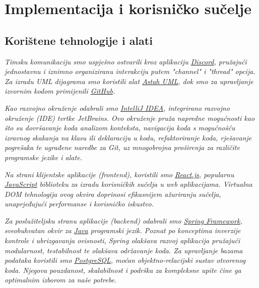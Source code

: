 
\chapter{Implementacija i korisničko sučelje}

		\usepackage{hyperref}
		
		\section{Korištene tehnologije i alati}

        \textit{ Timsku komunikaciju smo uspješno ostvarili kroz aplikaciju \href{https://discord.com/}{Discord}, pružajući jednostavnu i iznimno organiziranu interakciju putem "channel" i "thread" opcija. Za izradu UML dijagrama smo koristili alat \href{https://astah.net/products/astah-uml/}{Astah UML}, dok smo za upravljanje izvornim kodom primijenili \href{https://github.com/}{GitHub}.}

        \textit{Kao razvojno okruženje odabrali smo \href{https://www.jetbrains.com/idea/}{IntelliJ IDEA}, integrirano razvojno okruženje (IDE) tvrtke JetBrains. Ovo okruženje pruža napredne mogućnosti kao što su dovršavanje koda analizom konteksta, navigacija koda s mogućnošću izravnog skakanja na klasu ili deklaraciju u kodu, refaktoriranje koda, rješavanje pogrešaka te ugrađene naredbe za Git, uz mnogobrojna proširenja za različite programske jezike i alate.}

        \textit{Na strani klijentske aplikacije (frontend), koristili smo \href{https://reactjs.org/}{React.js}, popularnu \href{https://www.javascript.com/}{JavaScript} biblioteku za izradu korisničkih sučelja u web aplikacijama. Virtualna DOM tehnologija ovog okvira doprinosi efikasnijem ažuriranju sučelja, unaprjeđujući performanse i korisničko iskustvo.}

        \textit{Za poslužiteljsku stranu aplikacije (backend) odabrali smo \href{https://spring.io/}{Spring Framework}, sveobuhvatan okvir za \href{https://www.java.com/en/}{Java} programski jezik. Poznat po konceptima inverzije kontrole i ubrizgavanja ovisnosti, Spring olakšava razvoj aplikacija pružajući modularnost, testabilnost te olakšava održavanje koda. Za upravljanje bazama podataka koristili smo \href{https://www.postgresql.org/}{PostgreSQL}, moćan objektno-relacijski sustav otvorenog koda. Njegova pouzdanost, skalabilnost i podrška za kompleksne upite čine ga optimalnim izborom za naše potrebe}.
			
			\eject
		
